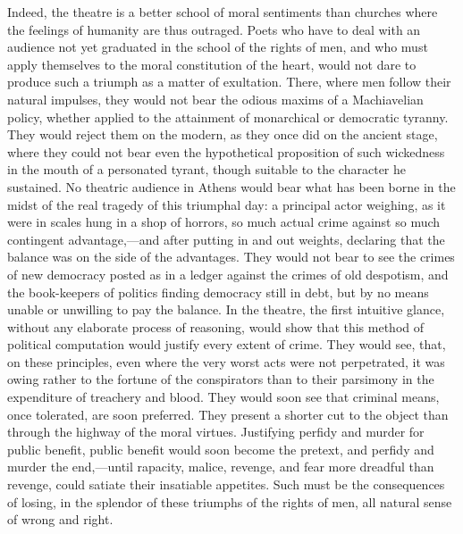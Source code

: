 Indeed, the theatre is a better school of moral sentiments than churches where the feelings of humanity are thus outraged. Poets who have to deal with an audience not yet graduated in the school of the rights of men, and who must apply themselves to the moral constitution of the heart, would not dare to produce such a triumph as a matter of exultation. There, where men follow their natural impulses, they would not bear the odious maxims of a Machiavelian policy, whether applied to the attainment of monarchical or democratic tyranny. They would reject them on the modern, as they once did on the ancient stage, where they could not bear even the hypothetical proposition of such wickedness in the mouth of a personated tyrant, though suitable to the character he sustained. No theatric audience in Athens would bear what has been borne in the midst of the real tragedy of this triumphal day: a principal actor weighing, as it were in scales hung in a shop of horrors, so much actual crime against so much contingent advantage,—and after putting in and out weights, declaring that the balance was on the side of the advantages. They would not bear to see the crimes of new democracy posted as in a ledger against the crimes of old despotism, and the book-keepers of politics finding democracy still in debt, but by no means unable or unwilling to pay the balance. In the theatre, the first intuitive glance, without any elaborate process of reasoning, would show that this method of political computation would justify every extent of crime. They would see, that, on these principles, even where the very worst acts were not perpetrated, it was owing rather to the fortune of the conspirators than to their parsimony in the expenditure of treachery and blood. They would soon see that criminal means, once tolerated, are soon preferred. They present a shorter cut to the object than through the highway of the moral virtues. Justifying perfidy and murder for public benefit, public benefit would soon become the pretext, and perfidy and murder the end,—until rapacity, malice, revenge, and fear more dreadful than revenge, could satiate their insatiable appetites. Such must be the consequences of losing, in the splendor of these triumphs of the rights of men, all natural sense of wrong and right.


